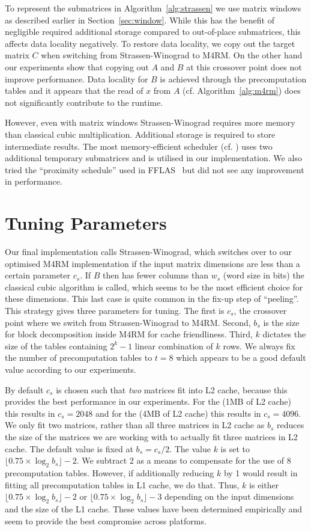 To represent the submatrices in Algorithm~\ref{alg:strassen} we use matrix windows as described earlier in Section~\ref{sec:window}. While this has the benefit of negligible required additional storage compared to out-of-place submatrices, this affects data locality negatively. To restore data locality, we copy out the target matrix $C$ when switching from Strassen-Winograd to M4RM. On the other hand our experiments show that copying out $A$ and $B$ at this crossover point does not improve performance. Data locality for $B$ is achieved through the precomputation tables and it appears that the read of $x$ from $A$ (cf. Algorithm~\ref{alg:m4rm}) does not significantly contribute to the runtime. 

However, even with matrix windows Strassen-Winograd requires more memory than classical cubic multiplication. Additional storage is required to store intermediate results. The most memory-efficient scheduler (cf. \cite{strassen-memory}) uses two additional temporary submatrices and is utilised in our implementation. We also tried the ``proximity schedule'' used in FFLAS~\cite{fflas} but did not see any improvement in performance.

\section{Tuning Parameters}
\label{sec:tuning}
Our final implementation calls Strassen-Winograd, which switches over to our optimised M4RM implementation if the input matrix dimensions are less than a certain parameter $c_s$. If $B$ then has fewer columns than $w_s$ (word size in bits) the classical cubic algorithm is called, which seems to be the most efficient choice for these dimensions. This last case is quite common in the fix-up step of ``peeling''. This strategy gives three parameters for tuning. The first is $c_s$, the crossover point where we switch from Strassen-Winograd to M4RM. Second, $b_s$ is the size for block decomposition inside M4RM for cache friendliness. Third, $k$ dictates the size of the tables containing $2^k - 1$ linear combination of $k$ rows. We always fix the number of precomputation tables to $t=8$ which appears to be a good default value according to our experiments.

By default $c_s$ is chosen such that \emph{two} matrices fit into L2 cache, because this provides the best performance in our experiments. For the
\Opteron (1MB of L2 cache) this results in $c_s=2048$ and for the \CTD (4MB of L2 cache) this results in $c_s=4096$. We only fit two matrices, rather than all three matrices in L2 cache as $b_s$ reduces the size of the matrices we are working with to actually fit three matrices in L2 cache. The default value is fixed at $b_s=c_s/2$. The value $k$ is set to $\lfloor 0.75 \times \log_2 b_s \rfloor - 2$. We subtract 2 as a means to compensate for the use of 8 precomputation tables. However, if additionally reducing $k$ by 1 would result in fitting all precomputation tables in L1 cache, we do that. Thus, $k$ is either $\lfloor 0.75 \times \log_2 b_s \rfloor - 2$ or $\lfloor 0.75 \times \log_2 b_s \rfloor - 3$ depending on the input dimensions and the size of the L1 cache. These values have been determined empirically and seem to provide the best compromise across platforms.

